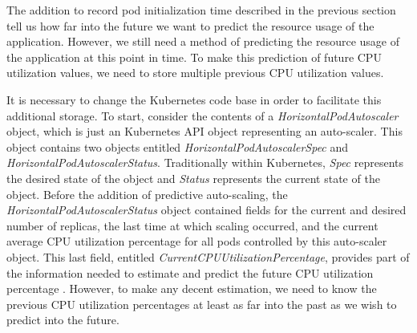 The addition to record pod initialization time described in the
previous section tell us how far into the future
we want to predict the resource usage of the application. However, we still need
a method of predicting the resource usage of the application at this point in
time. To make this prediction of future CPU utilization values,
we need to store multiple previous CPU utilization values.

It is necessary to change the Kubernetes code base in order
to facilitate this additional storage. To start,
consider the contents of a \textit{HorizontalPodAutoscaler} object, which is
just an Kubernetes API object representing an auto-scaler. This object contains
two objects entitled \textit{HorizontalPodAutoscalerSpec} and
\textit{HorizontalPodAutoscalerStatus}. Traditionally within
Kubernetes, \textit{Spec} represents the desired state of the object and
\textit{Status} represents the current state of the object. Before the addition
of predictive auto-scaling, the \textit{HorizontalPodAutoscalerStatus} object
contained fields for the current and desired number of replicas, the last time
at which scaling occurred, and the current average CPU utilization percentage for
all pods controlled by this auto-scaler object. This last field, entitled
\textit{CurrentCPUUtilizationPercentage}, provides part of the information
needed to estimate and predict the future CPU utilization
percentage \cite{k8s-horizontal-pod-autoscaler-object}.
However, to make any decent estimation, we need to know the previous CPU
utilization percentages at least as far into the past as we wish to predict into
the future.

